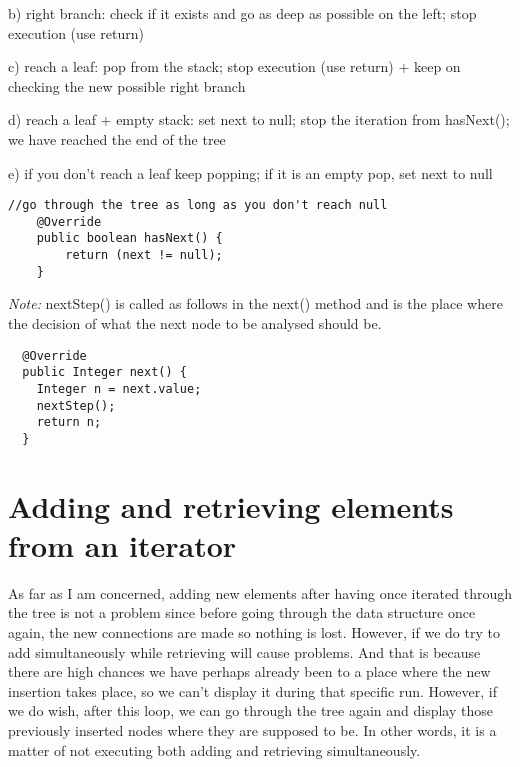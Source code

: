 \documentclass[a4paper,11pt]{article}
\begin{document}
\begin{flushleft}
    b) right branch: check if it exists and go as deep as possible on the left; stop execution (use return)
\end{flushleft}    
    
\begin{flushleft}    
    c) reach a leaf: pop from the stack; stop execution (use return) + keep on checking the new possible right branch
\end{flushleft}    
\begin{flushleft}    
    d) reach a leaf + empty stack: set next to null; stop the iteration from hasNext(); we have reached the end of the tree
\end{flushleft}
\begin{flushleft} 
e) if you don't reach a leaf keep popping; if it is an empty pop, set next to null
\end{flushleft}

\begin{verbatim}
//go through the tree as long as you don't reach null
    @Override
    public boolean hasNext() { 
        return (next != null);   
    }
\end{verbatim}       
        

\textit{Note:} nextStep() is called as follows in the next() method and is the place where the decision of what the next node to be analysed should be.

\begin{verbatim}
  @Override
  public Integer next() {
    Integer n = next.value;
    nextStep();
    return n;
  }
\end{verbatim}        
        

\section*{Adding and retrieving elements from an iterator}

As far as I am concerned, adding new elements after having once iterated through the tree is not a problem since before going through the data structure once again, the new connections are made so nothing is lost. However, if we do try to add simultaneously while retrieving will cause problems. And that is because there are high chances we have perhaps already been to a place where the new insertion takes place, so we can't display it during that specific run. However, if we do wish, after this loop, we can go through the tree again and display those previously inserted nodes where they are supposed to be. In other words, it is a matter of not executing both adding and retrieving simultaneously.
\end{document}
